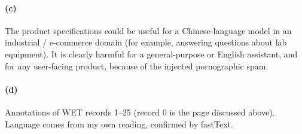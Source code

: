 \documentclass[11pt]{article}
\begin{document}
\paragraph{(c)}
The product specifications could be useful for a Chinese-language model in an
industrial / e-commerce domain (for example, answering questions about lab equipment). It is
clearly harmful for a general-purpose or English assistant, and for any user-facing
product, because of the injected pornographic spam.

\paragraph{(d)} Annotations of WET records 1--25 (record 0 is the page discussed above).
Language comes from my own reading, confirmed by fastText.
\end{document}

